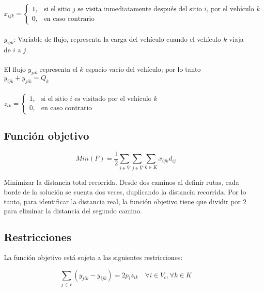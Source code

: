 \documentclass[letter, 10pt]{article}
\begin{document}
$x_{ijk} = \begin{cases}
            1, & \text{si el sitio $j$ se visita inmediatamente después del sitio $i$, por el vehículo $k$} \\
            0, & \text{en caso contrario}
    \end{cases}$
\\
\\

$y_{ijk}$: Variable de flujo, representa la carga del vehículo cuando el vehículo $k$ viaja de $i$ a $j$.
\\
\\

El flujo $y_{jik}$ representa el $k$ espacio vacío del vehículo; por lo tanto $y_{ijk} + y_{jik} = Q_{k}$
\\
\\

$z_{ik} = \begin{cases}
            1, & \text{si el sitio $i$ es visitado por el vehículo $k$} \\
            0, & \text{en caso contrario}
    \end{cases}$

\subsection{Función objetivo}

\begin{equation}
    \label{eq:FuncionObjetivo}
    Min(F) = \frac{1}{2}\sum_{i \in \bar{V}} \sum_{j \in \bar{V}} \sum_{k \in K}{x_{ijk}d_{ij}}
\end{equation}

Minimizar la distancia total recorrida. Desde dos caminos al definir rutas, cada borde de la solución se cuenta dos veces, duplicando la distancia recorrida. Por lo tanto, para identificar la distancia real, la función objetivo tiene que dividir por 2 para eliminar la distancia del segundo camino.

\subsection{Restricciones}

La función objetivo está sujeta a las siguientes restricciones:

\begin{equation}
    \label{eq:firstConstraint}
    \sum_{j \in \bar{V}}{(y_{jik} - y_{ijk})} = 2p_{i}z_{ik} \quad \forall i \in V_{c}, \forall k \in K
\end{equation}
\end{document}
